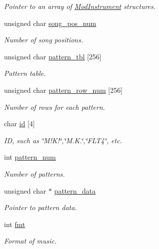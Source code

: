 \begin{DoxyCompactItemize}
\begin{DoxyCompactList}\small\item\em Pointer to an array of \hyperlink{structModInstrument}{Mod\+Instrument} structures. \end{DoxyCompactList}\item 
unsigned char \hyperlink{structModMusic_a314b376f9b8b67475b70d1e3579da361}{song\+\_\+pos\+\_\+num}
\begin{DoxyCompactList}\small\item\em Number of song positions. \end{DoxyCompactList}\item 
unsigned char \hyperlink{structModMusic_a48139937a46f8938045f3852dab34b33}{pattern\+\_\+tbl} \mbox{[}256\mbox{]}
\begin{DoxyCompactList}\small\item\em Pattern table. \end{DoxyCompactList}\item 
unsigned char \hyperlink{structModMusic_a4a84e33e38cc3b0734b3901276e8cf38}{pattern\+\_\+row\+\_\+num} \mbox{[}256\mbox{]}
\begin{DoxyCompactList}\small\item\em Number of rows for each pattern. \end{DoxyCompactList}\item 
char \hyperlink{structModMusic_a5c5d6cb058ca58e045eb51e0b036b3fb}{id} \mbox{[}4\mbox{]}
\begin{DoxyCompactList}\small\item\em I\+D, such as \char`\"{}\+M!\+K!\char`\"{},\char`\"{}\+M.\+K.\char`\"{},\char`\"{}\+F\+L\+T4\char`\"{}, etc. \end{DoxyCompactList}\item 
int \hyperlink{structModMusic_a94311ad25e92db0711cc9dfb5f25103d}{pattern\+\_\+num}
\begin{DoxyCompactList}\small\item\em Number of patterns. \end{DoxyCompactList}\item 
unsigned char $\ast$ \hyperlink{structModMusic_a4f279f645c007e434d897b480510e748}{pattern\+\_\+data}
\begin{DoxyCompactList}\small\item\em Pointer to pattern data. \end{DoxyCompactList}\item 
int \hyperlink{structModMusic_a8333fbe2d5747ef9397d371886d00a5c}{fmt}
\begin{DoxyCompactList}\small\item\em Format of music. \end{DoxyCompactList}\item 

\end{DoxyCompactItemize}
